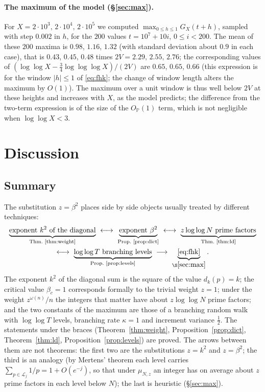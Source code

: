 \documentclass[11pt]{amsart}
\theoremstyle{definition}
\newcommand{\Pp}{\mathbb P}
\newcommand{\half}{\tfrac12}
\newcommand{\dk}{d_k}
\newcommand{\loglog}{\log\log}
\newcommand{\llll}{\log\log\log}
\begin{document}
\paragraph{The maximum of the model (\S\ref{sec:max}).} For $X=2\cdot10^3,\,2\cdot10^4,\,2\cdot10^5$ we
computed $\max_{0\le h\le1}G_X(t+h)$, sampled with step $0.002$ in $h$, for the $200$ values
$t=10^7+10i$, $0\le i<200$.
The mean of these $200$ maxima is $0.98$, $1.16$, $1.32$ (with standard deviation about $0.9$ in each
case), that is $0.43$, $0.45$, $0.48$ times $2V=2.29,\,2.55,\,2.76$; the corresponding values of
$(\loglog X-\tfrac34\llll X)/(2V)$ are $0.65$, $0.65$, $0.66$ (this expression is for the window $|h|\le1$ of \eqref{eq:fhk}; the change of window
length alters the maximum by $O(1)$). The maximum over a unit window is thus well below
$2V$ at these heights and increases with $X$, as the model predicts; the difference from the two-term
expression is of the size of the $O_{\Pp}(1)$ term, which is not negligible when $\loglog X<3$.

\section{Discussion}\label{sec:discussion}

\subsection{Summary}
The substitution $z=\beta^2$ places side by side objects usually treated by different techniques:
\begin{multline*}
\underbrace{\text{exponent $k^2$ of the diagonal}}_{\text{Thm.~\ref{thm:weight}}}
\ \longleftrightarrow\
\underbrace{\text{exponent $\beta^2$}}_{\text{Prop.~\ref{prop:dict}}}
\ \longleftrightarrow\
\underbrace{z\loglog N\text{ prime factors}}_{\text{Thm.~\ref{thm:ld}}}\\
\longleftrightarrow\
\underbrace{\loglog T\text{ branching levels}}_{\text{Prop.~\ref{prop:levels}}}
\ \longrightarrow\
\underbrace{\eqref{eq:fhk}}_{\S\ref{sec:max}}.
\end{multline*}
The exponent $k^2$ of the diagonal sum is the square of the value $\dk(p)=k$; the critical value $\beta_c=1$
corresponds formally to the trivial weight $z=1$; under the weight $z^{\omega(n)}/n$ the integers that matter
have about $z\loglog N$ prime factors; and the two constants of the maximum are those of a branching random walk
with $\loglog T$ levels, branching rate $\kappa=1$ and increment variance $\half$. The statements under the
braces (Theorem~\ref{thm:weight}, Proposition~\ref{prop:dict}, Theorem~\ref{thm:ld},
Proposition~\ref{prop:levels}) are proved. The arrows between them are not theorems: the first two are the
substitutions $z=k^2$ and $z=\beta^2$; the third is an analogy (by Mertens' theorem each level carries
$\sum_{p\in\mathcal L_j}1/p=1+O(e^{-j})$, so that under $\mu_{N,z}$ an integer has on average about $z$ prime
factors in each level below $N$); the last is heuristic (\S\ref{sec:max}).
\end{document}
